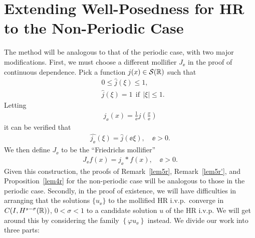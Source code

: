\section{Extending Well-Posedness for HR to the Non-Periodic Case}
\label{sec:defs}
The method will be analogous to that of the periodic case, with two major
modifications. First, we must choose a different mollifier $J_\ee$ in the
proof of continuous dependence. Pick a
function $j(x) \in \mathcal{S}(\mathbb{R})$ such that
\begin{equation*}
\begin{split}
& 0 \le \widehat{j}(\xi) \le 1,
\\
& \widehat{j}(\xi) = 1 \ \ \text{if} \ \ |\xi| \le 1.
\end{split}
\end{equation*}
Letting
\begin{equation*}
\begin{split}
j_\ee(x) = \frac{1}{\ee} j \left (\frac{x}{\ee} \right )
\end{split}
\end{equation*}
it can be verified that 
\begin{equation*}
\begin{split}
\widehat{j_\ee}(\xi) = \widehat{j }(\ee \xi), \quad \ee > 0.
\end{split}
\end{equation*}
We then define $J_\ee$ to be the ``Friedrichs mollifier''
\begin{equation*}
\begin{split}
J_\ee f(x) = j_\ee * f(x), \quad \ee>0.
\end{split}
\end{equation*}
Given this construction, the proofs of Remark~\ref{lem5r}, Remark~\ref{lem5r'}, and Proposition~\ref{lem4r} for the non-periodic case will be
analogous to those in the periodic case.
Secondly, in the proof of existence, we will have difficulties in arranging
that the solutions $\{u_\ee\}$ to the mollified HR i.v.p.\ converge in $C(I,
H^{s- \sigma}(\mathbb{R}))$, $0 < \sigma < 1$ to a candidate solution $u$ of the HR
i.v.p. We will get around this by considering the family $\left\{ \varphi
u_\ee \right\}$ instead.
%
%
%
%
We divide our work into three parts:
